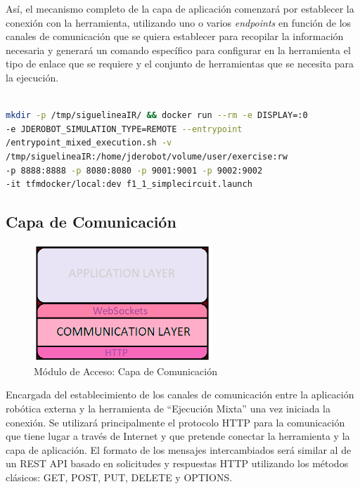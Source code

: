 Así, el mecanismo completo de la capa de aplicación comenzará por establecer la conexión con la herramienta, utilizando uno o varios \textit{endpoints} en función de los canales de comunicación que se quiera establecer para recopilar la información necesaria y generará un comando específico para configurar en la herramienta el tipo de enlace que se requiere y el conjunto de herramientas que se necesita para la ejecución.

\begin{lstlisting}[language=bash, caption=Comando de configuración de Ejecución Mixta]

mkdir -p /tmp/siguelineaIR/ && docker run --rm -e DISPLAY=:0
-e JDEROBOT_SIMULATION_TYPE=REMOTE --entrypoint 
/entrypoint_mixed_execution.sh -v 
/tmp/siguelineaIR:/home/jderobot/volume/user/exercise:rw 
-p 8888:8888 -p 8080:8080 -p 9001:9001 -p 9002:9002 
-it tfmdocker/local:dev f1_1_simplecircuit.launch

\end{lstlisting}


\subsection{Capa de Comunicación}

\begin{figure}[!hbtp]  \centering\noindent
    \includegraphics[width=0.6\textwidth]{figures/layer3.png}
    \caption{Módulo de Acceso: Capa de Comunicación}
    \label{layer3}
\end{figure}

Encargada del establecimiento de los canales de comunicación entre la aplicación robótica externa y la herramienta de ``Ejecución Mixta'' una vez iniciada la conexión. Se utilizará principalmente el protocolo HTTP para la comunicación que tiene lugar a través de Internet y que pretende conectar la herramienta y la capa de aplicación. El formato de los mensajes intercambiados será similar al de un REST API basado en solicitudes y respuestas HTTP utilizando los métodos clásicos: GET, POST, PUT, DELETE y OPTIONS.

